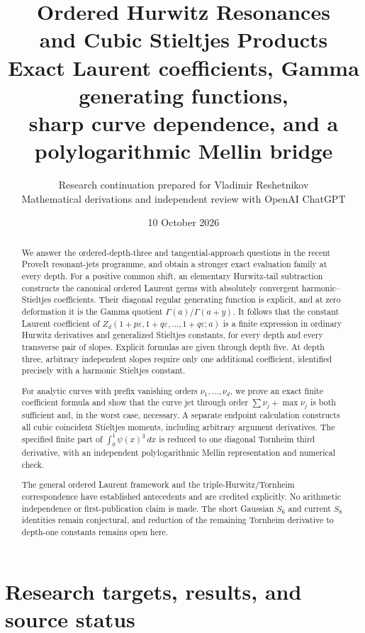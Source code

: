 \documentclass[11pt,letterpaper]{article}
\title{\color{inkblue}\bfseries Ordered Hurwitz Resonances\\[6pt]
and Cubic Stieltjes Products\\[10pt]
\large Exact Laurent coefficients, Gamma generating functions,\\
sharp curve dependence, and a polylogarithmic Mellin bridge}
\author{Research continuation prepared for Vladimir Reshetnikov\\
\small Mathematical derivations and independent review with OpenAI ChatGPT}
\date{10 October 2026}
\numberwithin{equation}{section}
\theoremstyle{definition}
\theoremstyle{remark}
\newcommand{\eps}{\varepsilon}
\begin{document}
\maketitle

\begin{abstract}
We answer the ordered-depth-three and tangential-approach questions in
the recent ProveIt resonant-jets programme, and obtain a stronger exact
evaluation family at every depth. For a positive common shift, an
elementary Hurwitz-tail subtraction constructs the canonical ordered
Laurent germs with absolutely convergent harmonic--Stieltjes
coefficients. Their diagonal regular generating function is explicit,
and at zero deformation it is the Gamma quotient
$\Gamma(a)/\Gamma(a+y)$. It follows that the constant Laurent coefficient
of $Z_d(1+p\eps,1+q\eps,\ldots,1+q\eps;a)$ is a finite expression
in ordinary Hurwitz derivatives and generalized Stieltjes constants,
for every depth and every transverse pair of slopes. Explicit formulas
are given through depth five. At depth three, arbitrary independent
slopes require only one additional coefficient, identified precisely
with a harmonic Stieltjes constant.

For analytic curves with prefix vanishing orders $\nu_1,\ldots,\nu_d$,
we prove an exact finite coefficient formula and show that the curve
jet through order $\sum\nu_j+\max\nu_j$ is both sufficient and, in the
worst case, necessary. A separate endpoint calculation constructs all
cubic coincident Stieltjes moments, including arbitrary argument
derivatives. The specified finite part of $\int_0^1\psi(x)^3\,dx$ is
reduced to one diagonal Tornheim third derivative, with an independent
polylogarithmic Mellin representation and numerical check.

The general ordered Laurent framework and the triple-Hurwitz/Tornheim
correspondence have established antecedents and are credited explicitly.
No arithmetic independence or first-publication claim is made. The
short Gaussian $S_6$ and current $S_8$ identities remain conjectural,
and reduction of the remaining Tornheim derivative to depth-one
constants remains open here.
\end{abstract}


\clearpage
\begingroup
\small
\setlength{\parskip}{0pt}
\tableofcontents
\endgroup
\clearpage

\section{Research targets, results, and source status}
\label{sec:scope}
\end{document}

